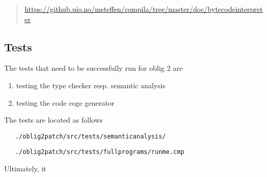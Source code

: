 \documentclass[11pt,freeform]{handout}[2014/08/13]
\begin{document}
\begin{quote}
  \url{https://github.uio.no/msteffen/compila/tree/master/doc/bytecodeinterpreter}
\end{quote}





\subsection{Tests }
\label{sec:tests}

The tests that need to be successfully run for oblig 2 are
\begin{enumerate}
\item testing the type checker resp. semantic analysis
\item testing the code coge generator
\end{enumerate}


The tests are located as follows



\begin{verbatim}
   ./oblig2patch/src/tests/semanticanalysis/
\end{verbatim}



\begin{verbatim}
   ./oblig2patch/src/tests/fullprograms/runme.cmp
\end{verbatim}


Ultimately, it 

%
% 




\end{document}
